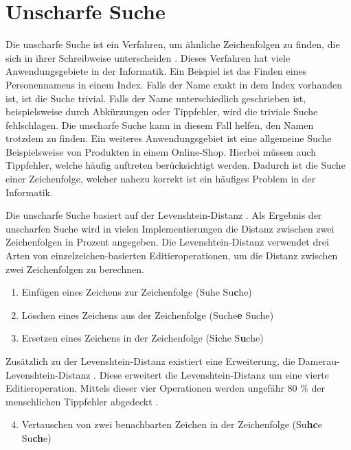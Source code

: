 \section{Unscharfe Suche}
\label{sec:unscharfe-suche}
Die unscharfe Suche ist ein Verfahren, um ähnliche Zeichenfolgen zu finden, die sich in ihrer Schreibweise unterscheiden \autocite{hall_approximate_1980}.
Dieses Verfahren hat viele Anwendungsgebiete in der Informatik.
Ein Beispiel ist das Finden eines Personennamens in einem Index.
Falls der Name exakt in dem Index vorhanden ist, ist die Suche trivial.
Falls der Name unterschiedlich geschrieben ist, beispielsweise durch Abkürzungen oder Tippfehler, wird die triviale Suche fehlschlagen.
Die unscharfe Suche kann in diesem Fall helfen, den Namen trotzdem zu finden.
Ein weiteres Anwendungsgebiet ist eine allgemeine Suche Beispielsweise von Produkten in einem Online-Shop.
Hierbei müssen auch Tippfehler, welche häufig auftreten berücksichtigt werden.
Dadurch ist die Suche einer Zeichenfolge, welcher nahezu korrekt ist ein häufiges Problem in der Informatik.

Die unscharfe Suche basiert auf der Levenshtein-Distanz \autocite{levenshtein_binary_1965}.
Als Ergebnis der unscharfen Suche wird in vielen Implementierungen die Distanz zwischen zwei Zeichenfolgen in Prozent angegeben.
Die Levenshtein-Distanz verwendet drei Arten von einzelzeichen-basierten Editieroperationen, um die Distanz zwischen zwei Zeichenfolgen zu berechnen.

\begin{enumerate}
    \item Einfügen eines Zeichens zur Zeichenfolge (Suhe \rightarrow{} Su\textbf{c}he)
    \item Löschen eines Zeichens aus der Zeichenfolge (Suche\textbf{e} \rightarrow{} Suche)
    \item Ersetzen eines Zeichens in der Zeichenfolge (S\textbf{i}che \rightarrow{} S\textbf{u}che)
\end{enumerate}

Zusätzlich zu der Levenshtein-Distanz existiert eine Erweiterung, die Damerau-Levenshtein-Distanz \autocite{damerau_technique_1964}.
Diese erweitert die Levenshtein-Distanz um eine vierte Editieroperation.
Mittels dieser vier Operationen werden ungefähr 80 \% der menschlichen Tippfehler abgedeckt \autocite{damerau_technique_1964}.

\begin{enumerate}
    \setcounter{enumi}{3}
    \item Vertauschen von zwei benachbarten Zeichen in der Zeichenfolge (Su\textbf{hc}e \rightarrow{} Su\textbf{ch}e)
\end{enumerate}

